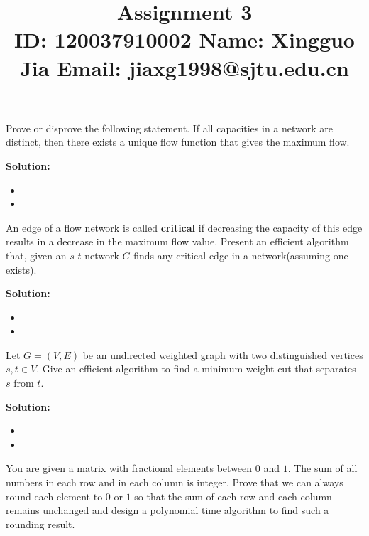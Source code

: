 \documentclass{article}
\title{{\bf Assignment 3} \\ {\large ID: 120037910002 } {\large Name: Xingguo Jia } {\large Email: jiaxg1998@sjtu.edu.cn}}
\author{}
\date{}
\newcounter{exercise}
\newcommand{\<}{
    \langle}
\renewcommand{\>}{
    \rangle}
\begin{document}
\maketitle


{\large





\begin{exercise}
Prove or disprove the following statement. If all capacities in a network are distinct,
 then there exists a unique flow function that gives the maximum flow.
\end{exercise}

\textbf{Solution:}
\begin{itemize}
    \item 
    \item 
\end{itemize}



\begin{exercise}
An edge of a flow network is called \textbf{critical} if decreasing the capacity of this edge results in a decrease in the maximum flow value. Present an efficient algorithm that, given an $s$-$t$ network $G$ finds any critical edge in a network(assuming one exists).
\end{exercise}

\textbf{Solution:}
\begin{itemize}
    \item 
    \item 
\end{itemize}



\begin{exercise}
Let $G=(V,E)$ be an undirected weighted graph with two distinguished vertices $s,t\in V$. Give an efficient algorithm to find a minimum weight cut that separates $s$ from $t$.
\end{exercise}

\textbf{Solution:}
\begin{itemize}
    \item 
    \item 
\end{itemize}



\begin{exercise}
You are given a matrix with fractional elements between $0$ and $1$. The sum of all numbers in each row and in each column is integer. Prove that we can always round each element to $0$ or $1$ so that the sum of each row and each column remains unchanged and design a polynomial time algorithm to find such a rounding result.
\end{exercise}

}
\end{document}
